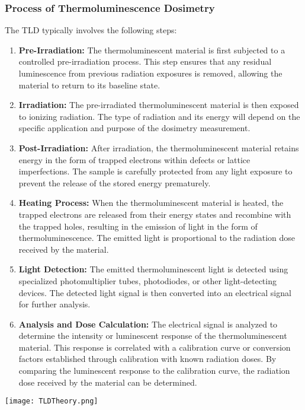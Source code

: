 \documentclass[../introduction.tex]{subfiles}
\begin{document}
    \subsubsection*{\large Process of Thermoluminescence Dosimetry}
        The TLD typically involves the following steps:
        \begin{enumerate}
            \item \textbf{Pre-Irradiation: } The thermoluminescent material is first subjected to a controlled 
            pre-irradiation process. This step ensures that any residual luminescence from previous radiation 
            exposures is removed, allowing the material to return to its baseline state.

            \item \textbf{Irradiation: } The pre-irradiated thermoluminescent material is then exposed to ionizing 
            radiation. The type of radiation and its energy will depend on the specific application and purpose of 
            the dosimetry measurement.

            \item \textbf{Post-Irradiation: } After irradiation, the thermoluminescent material retains energy in the 
            form of trapped electrons within defects or lattice imperfections. The sample is carefully protected from 
            any light exposure to prevent the release of the stored energy prematurely.

            \item \textbf{Heating Process: } When the thermoluminescent material is heated, the trapped electrons are 
            released from their energy states and recombine with the trapped holes, resulting in the emission of light 
            in the form of thermoluminescence. The emitted light is proportional to the radiation dose received by the 
            material.

            \item \textbf{Light Detection: } The emitted thermoluminescent light is detected using specialized 
            photomultiplier tubes, photodiodes, or other light-detecting devices. The detected light signal is then 
            converted into an electrical signal for further analysis.

            \item \textbf{Analysis and Dose Calculation: } The electrical signal is analyzed to determine the intensity 
            or luminescent response of the thermoluminescent material. This response is correlated with a calibration 
            curve or conversion factors established through calibration with known radiation doses. By comparing the 
            luminescent response to the calibration curve, the radiation dose received by the material can be determined.

        \end{enumerate}
        \begin{Figure}
            \centering
            \texttt{[image: TLDTheory.png]}
            \label{fig:TLDTheory}
        \end{Figure}
        
\end{document}

